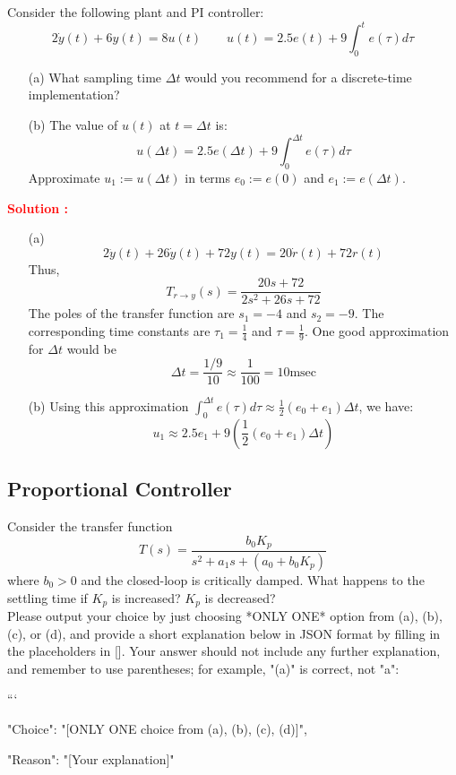 \documentclass[12pt]{article}
\begin{document}
Consider the following plant and PI controller:
\[2\dot{y}(t) + 6y(t) = 8u(t) \quad \quad  u(t) = 2.5e(t) + 9 \int_0^t e(\tau) d\tau\]
\begin{itemize}
    \item[(a)] What sampling time \(\Delta t\) would you recommend for a discrete-time implementation?
    \item[(b)] The value of \(u(t)\) at \(t = \Delta t\) is:
    \[u(\Delta t) = 2.5e(\Delta t) + 9 \int_0^{\Delta t} e(\tau) d\tau \]
    Approximate \(u_1:= u(\Delta t)\) in terms \(e_0 := e(0)\) and \(e_1:=e(\Delta t)\).

\end{itemize}
\textbf{\textcolor{red}{Solution :}}
\begin{itemize}
    \item[(a)]
    \[2\ddot{y}(t) + 26 \dot{y}(t) + 72 y(t) = 20 \dot{r}(t) + 72 r(t)\]
    Thus,
    \[T_{r \rightarrow y}(s) = \frac{20s+72}{2s^2 + 26s + 72}\]
    The poles of the transfer function are \(s_1 = -4\) and \(s_2 = -9\). The corresponding time constants are \(\tau_1 = \frac{1}{4}\) and \(\tau  = \frac{1}{9}\).
    One good approximation for \(\Delta t\) would be
    \[\Delta t = \frac{1/9}{10} \approx \frac{1}{100} = 10 \text{msec}\]
    \item[(b)] Using this approximation \(\int_0^{\Delta t} e(\tau) d\tau \approx \frac{1}{2}(e_0 + e_1) \Delta t\), we have:
    \[u_1 \approx  2.5 e_1 + 9(\frac{1}{2}(e_0 + e_1) \Delta t)\]
\end{itemize}
\clearpage

\subsection{Proportional Controller}

Consider the transfer function
\begin{equation}
    T(s) = \frac{b_0 K_p}{s^2+a_1s+(a_0 + b_0 K_p)}
\end{equation}
where \(b_0 > 0\) and the closed-loop is critically damped. What happens to the settling time if \(K_p\) is increased? \(K_p\) is decreased?\\
 Please output your choice by just choosing *ONLY ONE* option from (a), (b), (c), or (d), and provide a short explanation below in JSON format by filling in the placeholders in []. Your answer should not include any further explanation, and remember to use parentheses; for example, "(a)" is correct, not "a":

```
{

"Choice": "[ONLY ONE choice from (a), (b), (c), (d)]",

"Reason": "[Your explanation]"

}
\end{document}
